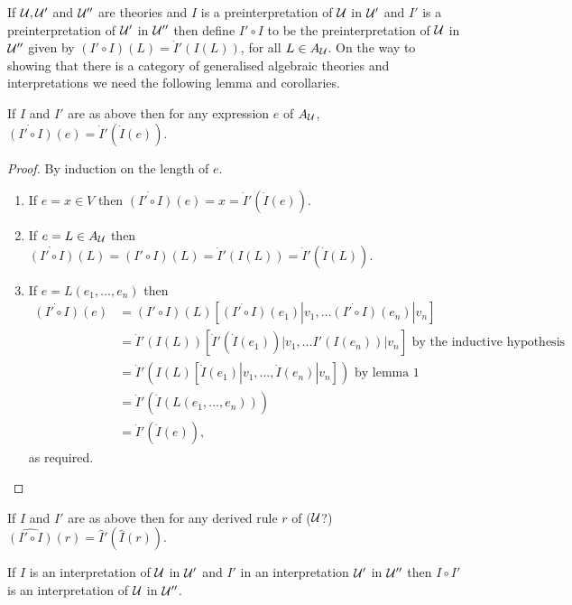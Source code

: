   If $\mathcal{U},\mathcal{U}'$ and $\mathcal{U}''$ are theories and $I$ is a preinterpretation of $\mathcal{U}$ in $\mathcal{U}'$ and $I'$ is a preinterpretation of $\mathcal{U}'$ in $\mathcal{U}''$ then define $I'\circ I$ to be the preinterpretation of $\mathcal{U}$ in $\mathcal{U}''$ given by $(I'\circ I)(L) = \dot I'(I(L))$, for all $L\in A_{\mathcal{U}}$.
  On the way to showing that there is a category of generalised algebraic theories and interpretations we need the following lemma and corollaries.

  \begin{lemma}[3]
    If $I$ and $I'$ are as above then for any expression $e$ of $A_{\mathcal{U}}$, $\dot{(I'\circ I)}(e) = \dot I'(\dot I(e)).$
  \end{lemma}
  \begin{proof}
    By induction on the length of $e$.
    \begin{enumerate}
      \item If $e = x\in V$ then $\dot{(I'\circ I)}(e)= x = \dot I'(\dot I(e)).$
      \item If $e=L\in A_{\mathcal{U}}$ then $\dot{(I'\circ I)}(L) = (I'\circ I)(L) = \dot I'(I(L)) = \dot I'(\dot I(L)).$
      \item If $e = L(e_1,\ldots,e_n)$ then
        \begin{align*}
          \dot{(I'\circ I)}(e) &= (I'\circ I)(L)[\dot{(I'\circ I)}(e_1)|v_1,\ldots\dot{(I'\circ I)}(e_n)|v_n] \\
          &= \dot I'(I(L))[\dot I'(\dot I(e_1))|v_1,\ldots I'(I(e_n))|v_n] \text{ by the inductive hypothesis}\\
          &=\dot I'(I(L)[\dot I(e_1)|v_1,\ldots,\dot I(e_n)|v_n]) \text{ by lemma 1}\\
          &=\dot I'(\dot I(L(e_1,\ldots,e_n)))\\
          &=\dot I'(\dot I(e)),
        \end{align*}
        as required.
    \end{enumerate}
  \end{proof}

  \begin{corollary}[4]
    If $I$ and $I'$ are as above then for any derived rule $r$ of ($\mathcal{U}$?)  $\widehat{(I'\circ I)}(r) = \hat I'(\hat I(r)).$
  \end{corollary}

  \begin{corollary}[5]
    If $I$ is an interpretation of $\mathcal{U}$ in $\mathcal{U}'$ and $I'$ in an interpretation $\mathcal{U}'$ in $\mathcal{U}''$ then $I\circ I'$ is an interpretation of $\mathcal{U}$ in $\mathcal{U}''$.
  \end{corollary}

